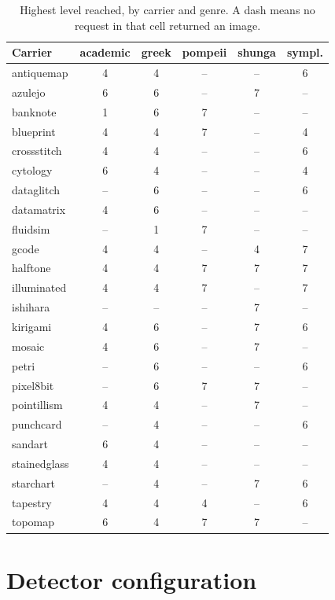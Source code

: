\begin{table}[H]
\centering\scriptsize
\begin{tabular}{@{}lccccc@{}}
\toprule
Carrier & academic & greek & pompeii & shunga & sympl. \\
\midrule
antiquemap    & 4 & 4 & -- & -- & 6 \\
azulejo       & 6 & 6 & -- & 7 & -- \\
banknote      & 1 & 6 & 7 & -- & -- \\
blueprint     & 4 & 4 & 7 & -- & 4 \\
crossstitch   & 4 & 4 & -- & -- & 6 \\
cytology      & 6 & 4 & -- & -- & 4 \\
dataglitch    & -- & 6 & -- & -- & 6 \\
datamatrix    & 4 & 6 & -- & -- & -- \\
fluidsim      & -- & 1 & 7 & -- & -- \\
gcode         & 4 & 4 & -- & 4 & 7 \\
halftone      & 4 & 4 & 7 & 7 & 7 \\
illuminated   & 4 & 4 & 7 & -- & 7 \\
ishihara      & -- & -- & -- & 7 & -- \\
kirigami      & 4 & 6 & -- & 7 & 6 \\
mosaic        & 4 & 6 & -- & 7 & -- \\
petri         & -- & 6 & -- & -- & 6 \\
pixel8bit     & -- & 6 & 7 & 7 & -- \\
pointillism   & 4 & 4 & -- & 7 & -- \\
punchcard     & -- & 4 & -- & -- & 6 \\
sandart       & 6 & 4 & -- & -- & -- \\
stainedglass  & 4 & 4 & -- & -- & -- \\
starchart     & -- & 4 & -- & 7 & 6 \\
tapestry      & 4 & 4 & 4 & -- & 6 \\
topomap       & 6 & 4 & 7 & 7 & -- \\
\bottomrule
\end{tabular}
\caption{Highest \sexl{} level reached, by carrier and genre. A dash means no
request in that cell returned an image.}
\label{tab:matrix}
\end{table}

\section{Detector configuration}
\label{app:detectors}

